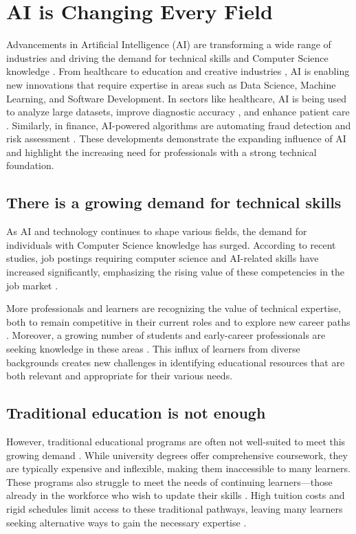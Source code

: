 \section{AI is Changing Every Field} 

Advancements in Artificial Intelligence (AI) are transforming a wide range of industries \cite{noauthor_ai_2023} and driving the demand for technical skills and Computer Science knowledge \cite{noauthor_reskilling_nodate}. From healthcare \cite{saxena_ai_2001} to education \cite{luckin_intelligence_2016} and creative industries \cite{noauthor_pdf_nodate}, AI is enabling new innovations that require expertise in areas such as Data Science, Machine Learning, and Software Development. In sectors like healthcare, AI is being used to analyze large datasets, improve diagnostic accuracy \cite{lenharo_ai_2023}, and enhance patient care \cite{khorsand_ai_2024}. Similarly, in finance, AI-powered algorithms are automating fraud detection and risk assessment \cite{noauthor_pdf_nodate}. These developments demonstrate the expanding influence of AI and highlight the increasing need for professionals with a strong technical foundation.

\subsection{There is a growing demand for technical skills}

As AI and technology continues to shape various fields, the demand for individuals with Computer Science knowledge has surged. According to recent studies, job postings requiring computer science and AI-related skills have increased significantly, emphasizing the rising value of these competencies in the job market \cite{noauthor_computer_nodate} \cite{noauthor_future_nodate}. 

More professionals and learners are recognizing the value of technical expertise, both to remain competitive in their current roles and to explore new career paths \cite{abe_future_2021}. Moreover, a growing number of students and early-career professionals are seeking knowledge in these areas \cite{noauthor_how_nodate}. This influx of learners from diverse backgrounds creates new challenges in identifying educational resources that are both relevant and appropriate for their various needs.

\subsection{Traditional education is not enough }
However, traditional educational programs are often not well-suited to meet this growing demand \cite{noauthor_opinion_nodate}. While university degrees offer comprehensive coursework, they are typically expensive and inflexible, making them inaccessible to many learners. These programs also struggle to meet the needs of continuing learners—those already in the workforce who wish to update their skills \cite{noauthor_lifelong_nodate}. High tuition costs and rigid schedules limit access to these traditional pathways, leaving many learners seeking alternative ways to gain the necessary expertise \cite{noauthor_college_nodate}.

